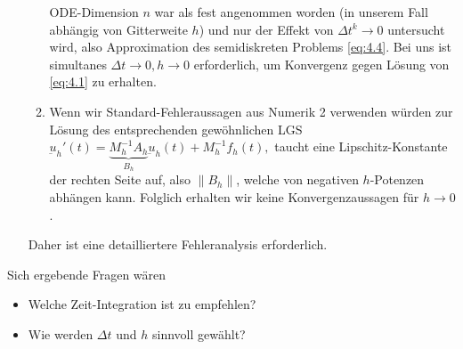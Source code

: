 \begin{itemize}
\begin{enumerate}[1.]
				ODE-Dimension $n$ war als fest angenommen worden (in unserem Fall abhängig von Gitterweite $h$) und nur der Effekt von $\Delta t^k \to 0$ untersucht wird, also Approximation des semidiskreten Problems \eqref{eq:4.4}.
				Bei uns ist simultanes $\Delta t \to 0, h \to 0$ erforderlich, um Konvergenz gegen Lösung von \eqref{eq:4.1} zu erhalten.
			\item
				Wenn wir Standard-Fehleraussagen aus Numerik 2 verwenden würden zur Lösung des entsprechenden gewöhnlichen LGS
				\begin{math}
					\underbar{u}_h'(t) = \underbrace{M_h^{-1} A_h}_{B_h} \underbar{u}_h(t) + M_h^{-1} f_h(t),
				\end{math}
				taucht eine Lipschitz-Konstante der rechten Seite auf, also $\|B_h\|$, welche von negativen $h$-Potenzen abhängen kann.
				Folglich erhalten wir keine Konvergenzaussagen für $h \to 0$.
		\end{enumerate}
		Daher ist eine detailliertere Fehleranalysis erforderlich.
\end{itemize}

Sich ergebende Fragen wären
\begin{itemize}
	\item
		Welche Zeit-Integration ist zu empfehlen?
	\item
		Wie werden $\Delta t$ und $h$ sinnvoll gewählt?
\end{itemize}

